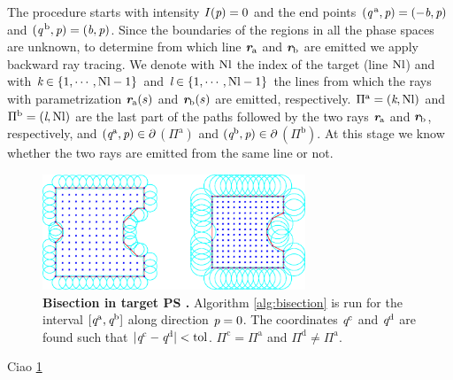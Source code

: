 The procedure starts with intensity $I(\textit{p})=0$ and the end points $(\textit{q}^{\,\textrm{a}}, \textit{p})= (-\textit{b}, \textit{p})$ and $(\textit{q}^{\,\textrm{b}}, \textit{p}) = (\textit{b}, \textit{p})$. Since the boundaries of the regions in all the phase spaces are unknown, to determine from which line $\textit{\textbf{r}}_{\textrm{a}}$ and $\textit{\textbf{r}}_{\textrm{b}}$ are emitted we apply backward ray tracing. We denote with $\textrm{Nl}$ the index of the target (line $\textrm{Nl}$) and with $\textit{k}\in\{1,\cdots, \textrm{Nl}-1\}$ and $\textit{l}\in\{1,\cdots, \textrm{Nl}-1\}$ the lines from which the rays with parametrization $\textit{\textbf{r}}_{\textrm{a}}(s)$ and $\textit{\textbf{r}}_{\textrm{b}}(s)$ are emitted, respectively. $\Pi^\textrm{a} = (\textit{k}, \textrm{Nl})$ and $\Pi^\textrm{b} = (\textit{l},\textrm{Nl})$ are the last part of the paths followed by the two rays $\textit{\textbf{r}}_{\textrm{a}}$ and $\textit{\textbf{r}}_{\textrm{b}}$, respectively, and $(\textit{q}^{\textrm{a}}, \textit{p})\in\partial$$(\Pi^{\textrm{a}})$ and $(\textit{q}^{\textrm{b}}, \textit{p})\in\partial$$(\Pi^{\textrm{b}})$. At this stage we know whether the two rays are emitted from the same line or not. \\ 
\begin{figure}[h]
  \begin{center}
  \includegraphics[width=0.7\textwidth]{figures/alpha_shape2D.png}
  \end{center}
  \caption{\textbf{Bisection in target PS .} Algorithm \ref{alg:bisection} is run for the interval $[\textit{q}^{\textrm{a}}, \textit{q}^{\textrm{b}}]$ along direction $\textit{p}=0$. The coordinates $\textit{q}^{\textrm{c}}$ and $\textit{q}^{\textrm{d}}$ are found such that 
$|\textit{q}^{\textrm{c}}-\textit{q}^{\textrm{d}}|<\textrm{tol}$. $\Pi^{\textrm{c}}= \Pi^{\textrm{a}}$ and $\Pi^{\textrm{d}}\neq \Pi^{\textrm{a}}$.}
\label{fig:bisec}
 \end{figure}
 Ciao \ref{fig:bisec}
